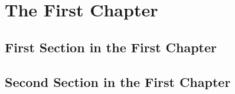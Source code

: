 \documentclass[a4paper, oneside]{scrreprt}
\begin{document}
	
	\chapter{The First Chapter}
	\blindtext
	
	
	\section{First Section in the First Chapter}
	\blindtext[2]
	
	\blinditemize
	
	\blindtext
	
	
	\section{Second Section in the First Chapter}
	\Blindtext
	
\end{document}
